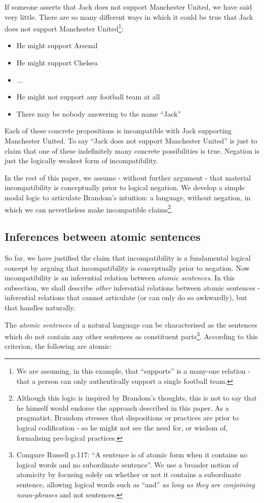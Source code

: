 \NI If someone asserts that Jack does not support Manchester United,
we have said very little.  There are so many different ways in which
it could be true that Jack does not support Manchester
United\footnote{We are assuming, in this example, that ``supports'' is
  a many-one relation - that a person can only authentically support a
  single football team.}:
\begin{itemize}
\item
He might support Arsenal
\item
He might support Chelsea
\item
...
\item
He might not support any football team at all
\item
There may be nobody answering to the name ``Jack''
\end{itemize}
Each of these concrete propositions is incompatible with Jack supporting Manchester United.
To say ``Jack does not support Manchester United'' is just to claim that one of these indefinitely many concrete possibilities is true.
Negation is just the logically weakest form of incompatibility.

In the rest of this paper, we assume - without further argument - that material incompatibility is conceptually prior to logical negation.
We develop a simple
 modal logic to articulate Brandom's intuition: a language, without negation, in which we can nevertheless make incompatible claims\footnote{Although this logic is inspired by Brandom's thoughts, this is not to say that he himself would endorse the approach described in this paper. As a pragmatist, Brandom stresses that dispositions or practices are prior to logical codification - so he might not see the need for, or wisdom of, formalising pre-logical practices.}.

\subsection{Inferences between atomic sentences}
\label{intrasentential}
So far, we have justified the claim that incompatibility is a
fundamental logical concept by arguing that incompatibility is
conceptually prior to negation.  Now incompatibility is an inferential
relation between \emph{atomic sentences}.  In this subsection, we
shall describe \emph{other} inferential relations between atomic
sentences - inferential relations that \fol{} cannot articulate (or
can only do so awkwardly), but that \cathoristic{} handles naturally.

The \emph{atomic sentences} of a natural language can be
characterised as the sentences which do not contain any other
sentences as constituent parts\footnote{Compare Russell \cite{russell}
  p.117: ``A sentence is of atomic form when it contains no logical
  words and no subordinate sentence''. We use a broader notion of
  atomicity by focusing solely on whether or not it contains a
  subordinate sentence, allowing logical words such as ``and'' \emph{as long
  as they are conjoining noun-phrases} and not sentences.}.  According
to this criterion, the following are atomic:

